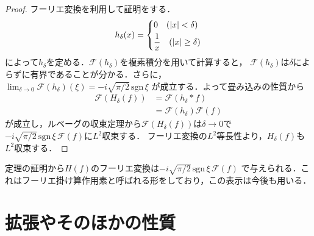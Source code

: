 \documentclass[dvipdfmx,autodetect-engine]{jsarticle}
\theoremstyle{remark}
\theoremstyle{definition}
\newcommand{\sgn}{\mathrm{sgn} \,}
\begin{document}
\begin{proof}
    フーリエ変換を利用して証明をする．
    \begin{align}
        h_{\delta}(x) = 
        \begin{dcases}
            0\quad (\lvert x \rvert < \delta) \\
            \frac{1}{x} \quad (\lvert x \rvert \geq \delta)
        \end{dcases}
    \end{align}
    によって$h_\delta$を定める．$\mathcal{F}(h_\delta)$を複素積分を用いて計算すると，
    $\mathcal{F}(h_\delta)$は$\delta$によらずに有界であることが分かる．さらに，
    $\lim_{\delta \to 0} \mathcal{F}(h_\delta) (\xi) = -i \sqrt{\pi / 2} \, \sgn \xi$
    が成立する．よって畳み込みの性質から
    \begin{align}
        \mathcal{F}(H_\delta (f)) &= \mathcal{F} (h_\delta \ast f) \\
            &= \mathcal{F}(h_\delta) \mathcal{F}(f)
    \end{align}
    が成立し，ルベーグの収束定理から$\mathcal{F}(H_\delta (f))$は$\delta\to 0$で
    $-i \sqrt{\pi / 2} \, \sgn \xi \, \mathcal{F}(f)$に$L^2$収束する．
    フーリエ変換の$L^2$等長性より，$H_\delta (f)$も$L^2$収束する．
\end{proof}

定理の証明から$H(f)$のフーリエ変換は$-i \sqrt{\pi / 2} \, \sgn \xi \, \mathcal{F}(f)$
で与えられる．これはフーリエ掛け算作用素と呼ばれる形をしており，この表示は今後も用いる．
\section{拡張やそのほかの性質}
    
\end{document}
